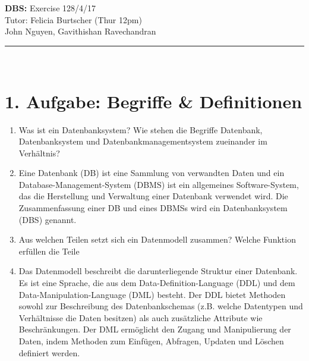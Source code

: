 \documentclass[12pt]{report}
\newcommand{\answer}{\textbf{A:}}
\newcommand{\TITLE}{\Large\textbf{DBS:} Exercise 1}
\newcommand{\AUTHOR}{\normalsize{John Nguyen, Gavithishan Ravechandran}}
\newcommand{\TUTOR}{\normalsize{Tutor: Felicia Burtscher (Thur 12pm)}}
\begin{document}
\noindent\TITLE \hfill 28/4/17\\[3pt]
\TUTOR\\
\AUTHOR\\
\rule{\textwidth}{0.4pt}\\

\section*{1. Aufgabe: Begriffe \& Definitionen}

\begin{enumerate}
\item[(4 P)] Was ist ein Datenbanksystem? Wie stehen die Begriffe Datenbank, Datenbanksystem und Datenbankmanagementsystem zueinander im Verhältnis?
\item[\answer]
  Eine Datenbank (DB) ist eine Sammlung von verwandten Daten und ein Database-Management-System (DBMS) ist ein allgemeines Software-System, das die Herstellung und Verwaltung einer Datenbank verwendet wird. Die Zusammenfassung einer DB und eines DBMSs wird ein Datenbanksystem (DBS) genannt.


\item[(6 P)] Aus welchen Teilen setzt sich ein Datenmodell zusammen? Welche Funktion erfüllen die Teile
\item[\answer]
  Das Datenmodell beschreibt die darunterliegende Struktur einer Datenbank. Es ist eine Sprache, die aus dem Data-Definition-Language (DDL) und dem Data-Manipulation-Language (DML) besteht. Der DDL bietet Methoden sowohl zur Beschreibung des Datenbankschemas (z.B. welche Datentypen und Verhältnisse die Daten besitzen) als auch zusätzliche Attribute wie Beschränkungen. Der DML ermöglicht den Zugang und Manipulierung der Daten, indem Methoden zum Einfügen, Abfragen, Updaten und Löschen definiert werden.



\end{enumerate}
\end{document}
